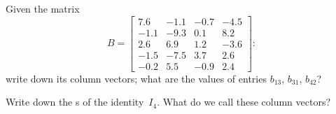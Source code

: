 \begin{exercise}  
Given the matrix
\begin{equation*}
B=\begin{bmatrix} 7.6&-1.1&-0.7&-4.5
\\  -1.1&-9.3&0.1&8.2
\\   2.6&6.9&1.2&-3.6
\\  -1.5&-7.5&3.7&2.6
\\  -0.2&5.5&-0.9&2.4 \end{bmatrix}:
\end{equation*}
write down its column vectors; what are the values of entries \(b_{13}\), \(b_{31}\), \(b_{42}\)?
\end{exercise}


\begin{exercise}  
Write down the s of the identity~\(I_4\).
What do we call these column vectors?
\end{exercise}





